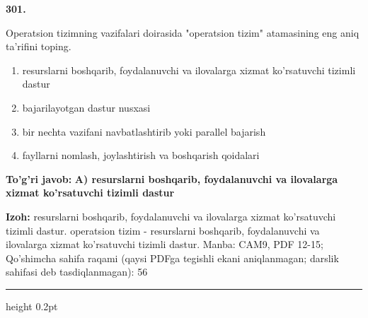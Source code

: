 \documentclass[10pt,a4paper]{article}
\begin{document}
{\bfseries\sffamily\color{ink} 301.}
\par
Operatsion tizimning vazifalari doirasida "operatsion tizim" atamasining eng aniq ta'rifini toping.
\begin{enumerate}[label=\Alph*),leftmargin=9mm]
\item resurslarni boshqarib, foydalanuvchi va ilovalarga xizmat ko'rsatuvchi tizimli dastur
\item bajarilayotgan dastur nusxasi
\item bir nechta vazifani navbatlashtirib yoki parallel bajarish
\item fayllarni nomlash, joylashtirish va boshqarish qoidalari
\end{enumerate}
\begin{tcolorbox}[enhanced,breakable,colback=teal!4,colframe=teal!60!black,boxrule=0.45pt,arc=1.2mm,left=2.7mm,right=2.7mm,top=1.8mm,bottom=1.8mm,before skip=2mm,after skip=2mm]
{\bfseries\sffamily\color{teal}To'g'ri javob:} \textbf{A) resurslarni boshqarib, foydalanuvchi va ilovalarga xizmat ko'rsatuvchi tizimli dastur}
\par\smallskip
{\bfseries Izoh:} resurslarni boshqarib, foydalanuvchi va ilovalarga xizmat ko'rsatuvchi tizimli dastur. operatsion tizim - resurslarni boshqarib, foydalanuvchi va ilovalarga xizmat ko'rsatuvchi tizimli dastur. Manba: CAM9, PDF 12-15; Qo'shimcha sahifa raqami (qaysi PDFga tegishli ekani aniqlanmagan; darslik sahifasi deb tasdiqlanmagan): 56
\end{tcolorbox}
\vspace{2mm}\hrule height 0.2pt\vspace{3mm}
\end{document}

